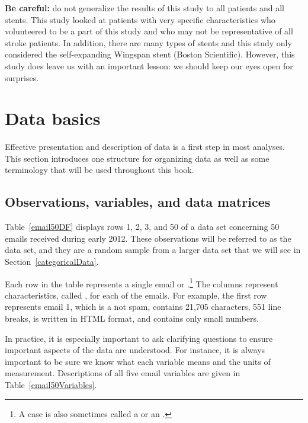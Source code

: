 \textbf{Be careful:} do not generalize the results of this study to all patients and all stents. This study looked at patients with very specific characteristics who volunteered to be a part of this study and who may not be representative of all stroke patients. In addition, there are many types of stents and this study only considered the self-expanding Wingspan stent (Boston Scientific). However, this study does leave us with an important lesson: we should keep our eyes open for surprises.


\section[Data basics]{Data basics }
\label{dataBasics}

Effective presentation and description of data is a first step in most analyses. This section introduces one structure for organizing data as well as some terminology that will be used throughout this book.

\subsection{Observations, variables, and data matrices}


Table~\ref{email50DF} displays rows 1, 2, 3, and 50 of a data set concerning 50 emails received during early 2012. These observations will be referred to as the  data set, and they are a random sample from a larger data set that we will see in Section~\ref{categoricalData}.

Each row in the table represents a single email or .\footnote{A case is also sometimes called a  or an .} The columns represent characteristics, called , for each of the emails. For example, the first row represents email 1, which is a not spam, contains 21,705 characters, 551 line breaks, is written in HTML format, and contains only small numbers.

In practice, it is especially important to ask clarifying questions to ensure important aspects of the data are understood. For instance, it is always important to be sure we know what each variable means and the units of measurement. Descriptions of all five email variables are given in Table~\ref{email50Variables}.

